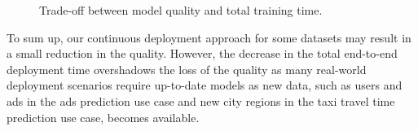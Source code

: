 \begin{figure}[!h]
\centering
\resizebox{\columnwidth}{!}{}
\caption{Trade-off between model quality and total training time.}
\label{quality-vs-time}
\end{figure}




To sum up, our continuous deployment approach for some datasets may result in a small reduction in the quality.
However, the decrease in the total end-to-end deployment time overshadows the loss of the quality as many real-world deployment scenarios require up-to-date models as new data, such as users and ads in the ads prediction use case and new city regions in the taxi travel time prediction use case, becomes available.


